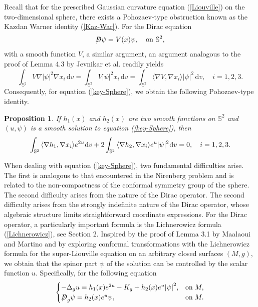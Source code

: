 \documentclass[a4paper, 12pt]{article}
\newtheorem{proposition}[theorem]{Proposition}
\def\slashiii#1{\setbox0=\hbox{$#1$}#1\hskip-\wd0\hbox to\wd0{\hss\sl/\/\hss}}
\begin{document}
	Recall that for the prescribed Gaussian curvature equation (\ref{Liouville}) on the two-dimensional sphere, there exists a Pohozaev-type obstruction known as the Kazdan Warner identity (\ref{Kaz-War}). For the Dirac equation
	\[
	\slashiii{D}\psi = V(x)\psi,\quad \text{on}\ {\mathbb{S}^2} ,
	\]
	with a smooth function $V$, a similar argument, an argument analogous to the proof of Lemma 4.3 by Jevnikar et al. \cite{MR4206467} readily yields
	\[
	\int_{{\mathbb{S}^2}} V \nabla |\psi|^2 \nabla x_i \, {\text{d}}{v} = \int_{{\mathbb{S}^2}} V |\psi|^2x_i  \, {\text{d}}{v} = \int_{{\mathbb{S}^2}} \langle \nabla V, \nabla x_i \rangle |\psi|^2 \, {\text{d}}{v},\quad i=1,2,3.
	\]
	Consequently, for equation (\ref{key-Sphere}), we obtain the following Pohozaev-type identity.
	\begin{proposition}\label{Kazdan-w}
		If $h_1(x)$ and $h_2(x)$ are two smooth functions on ${\mathbb{S}^2}$ and $(u,\psi)$ is a smooth solution to equation (\ref{key-Sphere}), then
		\[\int_{{\mathbb{S}^2}} {\langle \nabla {h_1},\nabla {x_i}\rangle } {e^{2u}}{\mkern 1mu} {\text{d}}v + 2\int_{{\mathbb{S}^2}} {\langle \nabla {h_2},\nabla {x_i}\rangle } {e^u}|\psi {|^2}{\mkern 1mu} {\text{d}}v = 0,\quad i = 1,2,3.\]
	\end{proposition}
	When dealing with equation (\ref{key-Sphere}), two fundamental difficulties arise. The first is analogous to that encountered in the Nirenberg problem and is related to the non-compactness of the conformal symmetry group of the sphere. The second difficulty arises from the nature of the Dirac operator. The second difficulty arises from the strongly indefinite nature of the Dirac operator, whose algebraic structure limits straightforward coordinate expressions. For the Dirac operator, a particularly important formula is the Lichnerowicz formula (\ref{Lichnerowicz}), see Section 2. Inspired by the proof of Lemma 3.1 by Maalaoui and Martino \cite{MR4423145} and by exploring conformal transformations with the Lichnerowicz formula for the super-Liouville equation on an arbitrary closed surfaces $(M,g)$, we obtain that the spinor part \(\psi\) of the solution can be controlled by the scalar function \(u\). Specifically, for the following equation
	\begin{equation}\label{general}
		\begin{cases}
			{ - {\Delta _g}u = h_1(x){e^{2u}} - {K_g} + h_2(x){e^u}{{\left| \psi  \right|}^2},}&{{\text{on}}\;{M},} \\
			{{\slashiii{D}_g}\psi  = h_2(x){e^u}\psi ,}&{{\text{on}}\;{M}.}
		\end{cases}
	\end{equation}
\end{document}
